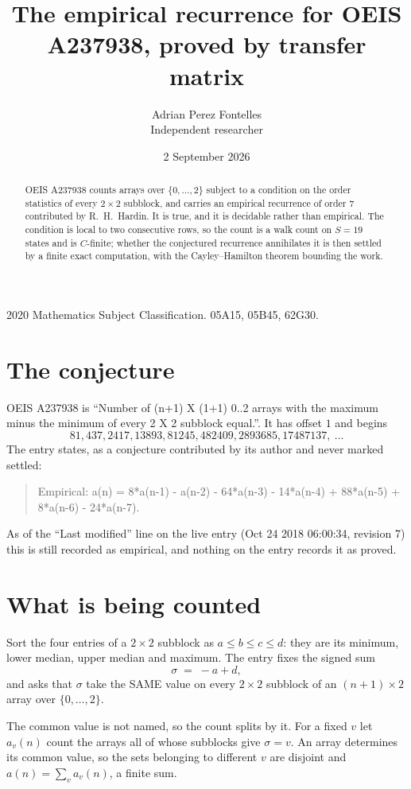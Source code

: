 \documentclass[11pt,a4paper]{article}
\title{The empirical recurrence for OEIS A237938, proved by transfer matrix}
\author{Adrian Perez Fontelles\\ \small Independent researcher}
\date{2 September 2026}
\theoremstyle{plain}
\theoremstyle{definition}
\begin{document}
\maketitle

\begin{abstract}
OEIS A237938 counts arrays over $\{0,\dots,2\}$ subject to a condition on the order
statistics of every $2\times2$ subblock, and carries an empirical recurrence of order
$7$ contributed by R.~H.~Hardin. It is true, and it is decidable rather than empirical.
The condition is local to two consecutive rows, so the count is a walk count on $S=19$
states and is $C$-finite; whether the conjectured recurrence annihilates it is then settled by
a finite exact computation, with the Cayley--Hamilton theorem bounding the work.
\end{abstract}

\noindent\small 2020 Mathematics Subject Classification. 05A15, 05B45, 62G30.\normalsize

\section{The conjecture}

OEIS A237938 is ``Number of (n+1) X (1+1) 0..2 arrays with the maximum minus the minimum of every 2 X 2 subblock equal.''. It has offset $1$ and begins
\[
81, 437, 2417, 13893, 81245, 482409, 2893685, 17487137,\ \dots
\]
The entry states, as a conjecture contributed by its author and never marked settled:
\begin{quote}
Empirical: a(n) = 8*a(n-1) - a(n-2) - 64*a(n-3) - 14*a(n-4) + 88*a(n-5) + 8*a(n-6) - 24*a(n-7).
\end{quote}
As of the ``Last modified'' line on the live entry (Oct 24 2018 06:00:34, revision 7) this is still
recorded as empirical, and nothing on the entry records it as proved.

\section{What is being counted}

Sort the four entries of a $2\times2$ subblock as $a\le b\le c\le d$: they
are its minimum, lower median, upper median and maximum. The entry fixes the signed sum
\[
\sigma\;=\;-a+d,
\]
and asks that $\sigma$ take the SAME value on every $2\times2$ subblock of an
$(n+1)\times2$ array over $\{0,\dots,2\}$.

The common value is not named, so the count splits by it. For a fixed $v$ let $a_v(n)$ count
the arrays all of whose subblocks give $\sigma=v$. An array determines its common value, so
the sets belonging to different $v$ are disjoint and $a(n)=\sum_v a_v(n)$, a finite sum.
\end{document}

